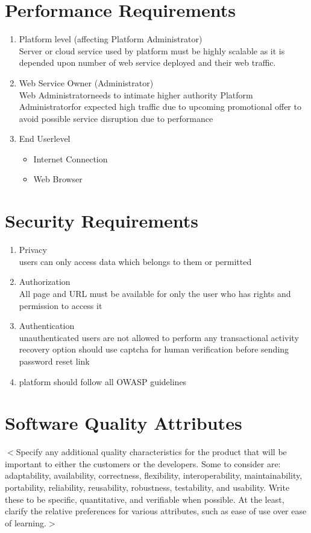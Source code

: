\documentclass{scrreprt}
\newcommand*\arrow{\item[$\Rightarrow$]}
\def\superuser{Platform Administrator}
\def\admin{Administrator}
\def\user{End User}
\begin{document}
\section{Performance Requirements}
\begin{enumerate}[start=1,label={\bfseries REQ \arabic*:}]
	\addtolength{\itemindent}{40pt}
	\item Platform level (affecting \superuser)
		\\ Server or cloud service used by platform must be highly scalable as it is depended upon number of web service deployed and their web traffic.
	\item Web Service Owner (\admin)
		\\ Web \admin \space needs to intimate higher authority \superuser \space for expected high traffic due to upcoming promotional offer to avoid possible service disruption due to performance
	\item \user \space level
		\begin{itemize}
			\arrow Internet Connection
			\arrow Web Browser
		\end{itemize}
\end{enumerate}

\section{Security Requirements}

\begin{enumerate}[start=1,label={\bfseries REQ \arabic*:}]
	\addtolength{\itemindent}{40pt}
	\item Privacy
		\\ users can only access data which belongs to them or permitted
	\item Authorization
		\\ All page and URL must be available for only the user who has rights and permission to access it
	\item Authentication
		\\ unauthenticated users are not allowed to perform any transactional activity
		\\ recovery option should use captcha for human verification before sending password reset link
	\item platform should follow all OWASP guidelines
		
\end{enumerate}

\section{Software Quality Attributes}
$<$Specify any additional quality characteristics for the product that will be 
important to either the customers or the developers. Some to consider are: 
adaptability, availability, correctness, flexibility, interoperability, 
maintainability, portability, reliability, reusability, robustness, testability, 
and usability. Write these to be specific, quantitative, and verifiable when 
possible. At the least, clarify the relative preferences for various attributes, 
such as ease of use over ease of learning.$>$
\end{document}
